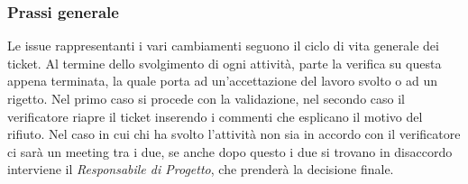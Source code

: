  \subsubsection{Prassi generale}
 Le issue rappresentanti i vari cambiamenti seguono il ciclo di vita generale dei ticket.
 Al termine dello svolgimento di ogni attività, parte la verifica su questa appena terminata, la quale porta ad un'accettazione
del lavoro svolto o ad un rigetto. Nel primo caso si procede con la validazione, nel secondo caso il verificatore riapre il ticket inserendo i commenti
che esplicano il motivo del rifiuto. Nel caso in cui chi ha svolto l'attività non sia in accordo con il verificatore ci sarà un meeting tra i due, se anche
dopo questo i due si trovano in disaccordo interviene il \textit{Responsabile di Progetto}, che prenderà la decisione finale.